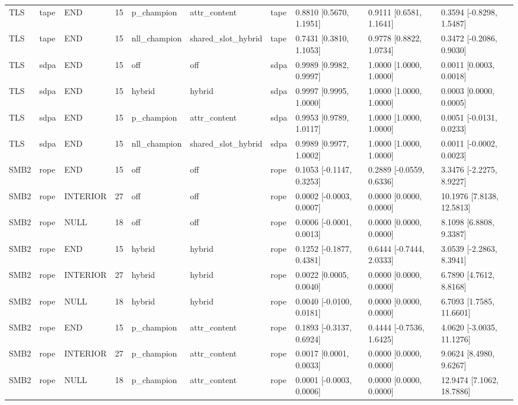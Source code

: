 \begin{tabular}{llllllllll}
TLS & tape & END & 15 & p\_champion & attr\_content & tape & 0.8810 [0.5670, 1.1951] & 0.9111 [0.6581, 1.1641] & 0.3594 [-0.8298, 1.5487] \\
TLS & tape & END & 15 & nll\_champion & shared\_slot\_hybrid & tape & 0.7431 [0.3810, 1.1053] & 0.9778 [0.8822, 1.0734] & 0.3472 [-0.2086, 0.9030] \\
TLS & sdpa & END & 15 & off & off & sdpa & 0.9989 [0.9982, 0.9997] & 1.0000 [1.0000, 1.0000] & 0.0011 [0.0003, 0.0018] \\
TLS & sdpa & END & 15 & hybrid & hybrid & sdpa & 0.9997 [0.9995, 1.0000] & 1.0000 [1.0000, 1.0000] & 0.0003 [0.0000, 0.0005] \\
TLS & sdpa & END & 15 & p\_champion & attr\_content & sdpa & 0.9953 [0.9789, 1.0117] & 1.0000 [1.0000, 1.0000] & 0.0051 [-0.0131, 0.0233] \\
TLS & sdpa & END & 15 & nll\_champion & shared\_slot\_hybrid & sdpa & 0.9989 [0.9977, 1.0002] & 1.0000 [1.0000, 1.0000] & 0.0011 [-0.0002, 0.0023] \\
SMB2 & rope & END & 15 & off & off & rope & 0.1053 [-0.1147, 0.3253] & 0.2889 [-0.0559, 0.6336] & 3.3476 [-2.2275, 8.9227] \\
SMB2 & rope & INTERIOR & 27 & off & off & rope & 0.0002 [-0.0003, 0.0007] & 0.0000 [0.0000, 0.0000] & 10.1976 [7.8138, 12.5813] \\
SMB2 & rope & NULL & 18 & off & off & rope & 0.0006 [-0.0001, 0.0013] & 0.0000 [0.0000, 0.0000] & 8.1098 [6.8808, 9.3387] \\
SMB2 & rope & END & 15 & hybrid & hybrid & rope & 0.1252 [-0.1877, 0.4381] & 0.6444 [-0.7444, 2.0333] & 3.0539 [-2.2863, 8.3941] \\
SMB2 & rope & INTERIOR & 27 & hybrid & hybrid & rope & 0.0022 [0.0005, 0.0040] & 0.0000 [0.0000, 0.0000] & 6.7890 [4.7612, 8.8168] \\
SMB2 & rope & NULL & 18 & hybrid & hybrid & rope & 0.0040 [-0.0100, 0.0181] & 0.0000 [0.0000, 0.0000] & 6.7093 [1.7585, 11.6601] \\
SMB2 & rope & END & 15 & p\_champion & attr\_content & rope & 0.1893 [-0.3137, 0.6924] & 0.4444 [-0.7536, 1.6425] & 4.0620 [-3.0035, 11.1276] \\
SMB2 & rope & INTERIOR & 27 & p\_champion & attr\_content & rope & 0.0017 [0.0001, 0.0033] & 0.0000 [0.0000, 0.0000] & 9.0624 [8.4980, 9.6267] \\
SMB2 & rope & NULL & 18 & p\_champion & attr\_content & rope & 0.0001 [-0.0003, 0.0006] & 0.0000 [0.0000, 0.0000] & 12.9474 [7.1062, 18.7886] \\

\end{tabular}
